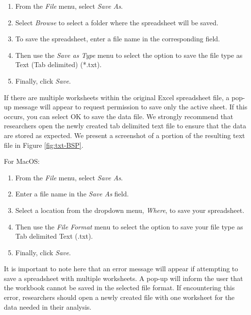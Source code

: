 \documentclass[
]{book}
\providecommand{\tightlist}{%
  \setlength{\itemsep}{0pt}\setlength{\parskip}{0pt}}
\begin{document}
\begin{enumerate}
\def\labelenumi{\arabic{enumi}.}
\tightlist
\item
  From the \emph{File} menu, select \emph{Save As}.
\item
  Select \emph{Browse} to select a folder where the spreadsheet will be saved.
\item
  To save the spreadsheet, enter a file name in the corresponding field.
\item
  Then use the \emph{Save as Type} menu to select the option to save the file type as Text (Tab delimited) (*.txt).
\item
  Finally, click \emph{Save}.
\end{enumerate}

If there are multiple worksheets within the original Excel spreadsheet file, a pop-up message will appear to request permission to save only the active sheet. If this occurs, you can select OK to save the data file. We strongly recommend that researchers open the newly created tab delimited text file to ensure that the data are stored as expected. We present a screenshot of a portion of the resulting text file in Figure \ref{fig:txt-BSP}.

For MacOS:

\begin{enumerate}
\def\labelenumi{\arabic{enumi}.}
\tightlist
\item
  From the \emph{File} menu, select \emph{Save As}.
\item
  Enter a file name in the \emph{Save As} field.
\item
  Select a location from the dropdown menu, \emph{Where}, to save your spreadsheet.
\item
  Then use the \emph{File Format} menu to select the option to save your file type as Tab delimited Text (.txt).
\item
  Finally, click \emph{Save}.
\end{enumerate}

It is important to note here that an error message will appear if attempting to save a spreadsheet with multiple worksheets. A pop-up will inform the user that the workbook cannot be saved in the selected file format. If encountering this error, researchers should open a newly created file with one worksheet for the data needed in their analysis.
\end{document}
